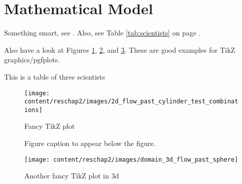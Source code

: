 \section{Mathematical Model}
Something smart, see \cite{EmmitBrown1947}. Also, see Table \ref{tab:scientists} on page \pageref{tab:scientists}.

Also have a look at Figures \ref{fig:test_combinations}, \ref{fig:some_results_plot}, and \ref{fig:3dgraphic}. These are good examples for TikZ graphics/pgfplots.

\begin{table}[p]
  \centering
  \caption{This is a table of three scientists}
  \label{tab:scientists}
\end{table}

\begin{figure}[p]
 \centering
 \texttt{[image: content/reschap2/images/2d\_flow\_past\_cylinder\_test\_combinations]}
 \caption{Fancy TikZ plot}
 \label{fig:test_combinations}
\end{figure}

\begin{figure}[p!]
 \centering
 \captionsetup[sub]{skip=0ex}
 \hfill
%
 \caption[Figure caption to appear in \textsl{List of Figures}]{Figure caption to appear below the figure.}
 \label{fig:some_results_plot}
\end{figure}

\begin{figure}[p]
 \centering
 \texttt{[image: content/reschap2/images/domain\_3d\_flow\_past\_sphere]}
 \caption{Another fancy TikZ plot in 3d}
 \label{fig:3dgraphic}
\end{figure}
